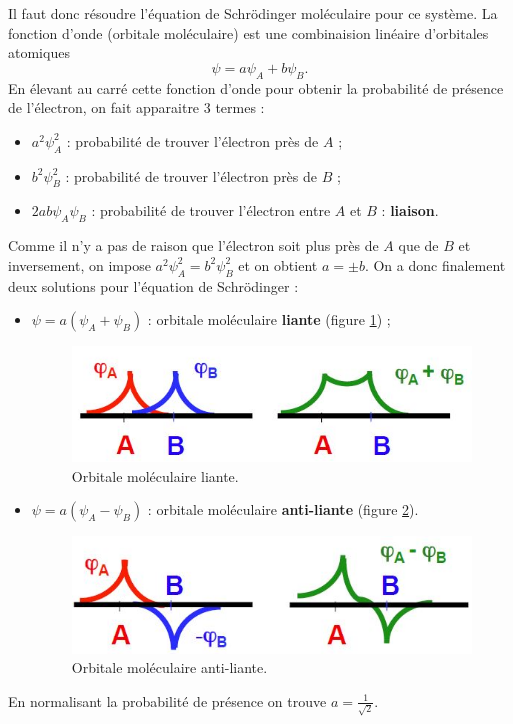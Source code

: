 Il faut donc résoudre l'équation de Schrödinger
moléculaire pour ce système. La fonction d'onde (orbitale moléculaire)
est une combinaision linéaire d'orbitales atomiques
\[ \psi = a\psi_A + b\psi_B. \]
En élevant au carré cette fonction d'onde pour
obtenir la probabilité de présence de l'électron, on
fait apparaitre 3 termes :
\begin{itemize}
	\item $a^2\psi_A^2$ : probabilité de trouver l'électron
	près de $A$ ;
	\item $b^2\psi_B^2$ : probabilité de trouver l'électron
	près de $B$ ;
	\item $2ab\psi_A\psi_B$ : probabilité de trouver l'électron
	entre $A$ et $B$ : \textbf{liaison}.
\end{itemize}
Comme il n'y a pas de raison que l'électron soit plus près
de $A$ que de $B$ et inversement, on impose $a^2\psi_A^2=b^2\psi_B^2$
et on obtient $a = \pm b$. On a donc finalement
deux solutions pour l'équation de Schrödinger :
\begin{itemize}
	\item $\psi = a(\psi_A+\psi_B)$ : orbitale moléculaire \textbf{liante}
	(figure \ref{fig:liante}) ;
	\begin{figure}[ht]
		\centering
		\includegraphics[scale=0.8]{img/orb-liante.jpg}
		\caption{Orbitale moléculaire liante.}
		\label{fig:liante}
	\end{figure}
	\item $\psi = a(\psi_A-\psi_B)$ : orbitale moléculaire
	\textbf{anti-liante} (figure \ref{fig:anti-liante}).
	\begin{figure}[ht]
		\centering
		\includegraphics[scale=0.8]{img/orb-anti-liante.jpg}
		\caption{Orbitale moléculaire anti-liante.}
		\label{fig:anti-liante}
	\end{figure}
\end{itemize}
En normalisant la probabilité de présence on trouve $a = \frac{1}{\sqrt{2}}$.

